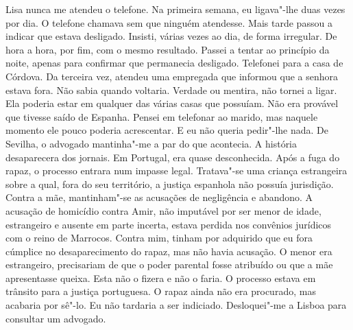 Lisa nunca me atendeu o telefone. Na primeira semana, eu ligava"-lhe
duas vezes por dia. O telefone chamava sem que ninguém atendesse. Mais
tarde passou a indicar que estava desligado. Insisti, várias vezes ao
dia, de forma irregular. De hora a hora, por fim, com o mesmo resultado.
Passei a tentar ao princípio da noite, apenas para confirmar que
permanecia desligado. Telefonei para a casa de Córdova. Da terceira vez,
atendeu uma empregada que informou que a senhora estava fora. Não sabia
quando voltaria. Verdade ou mentira, não tornei a ligar. Ela poderia
estar em qualquer das várias casas que possuíam. Não era provável que
tivesse saído de Espanha. Pensei em telefonar ao marido, mas naquele
momento ele pouco poderia acrescentar. E eu não queria pedir"-lhe nada.
De Sevilha, o advogado mantinha"-me a par do que acontecia. A história
desaparecera dos jornais. Em Portugal, era quase desconhecida. Após a
fuga do rapaz, o processo entrara num impasse legal. Tratava"-se uma
criança estrangeira sobre a qual, fora do seu território, a justiça
espanhola não possuía jurisdição. Contra a mãe, mantinham"-se as
acusações de negligência e abandono. A acusação de homicídio contra
Amir, não imputável por ser menor de idade, estrangeiro e ausente em
parte incerta, estava perdida nos convênios jurídicos com o reino de
Marrocos. Contra mim, tinham por adquirido que eu fora cúmplice no
desaparecimento do rapaz, mas não havia acusação. O menor era
estrangeiro, precisariam de que o poder parental fosse atribuído ou que
a mãe apresentasse queixa. Esta não o fizera e não o faria. O processo
estava em trânsito para a justiça portuguesa. O rapaz ainda não era
procurado, mas acabaria por sê"-lo. Eu não tardaria a ser indiciado.
Desloquei"-me a Lisboa para consultar um advogado.

